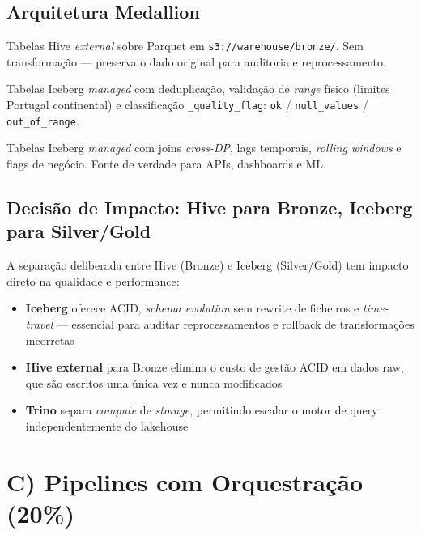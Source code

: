 \documentclass[11pt,a4paper]{article}
\begin{document}
\subsection{Arquitetura Medallion}

\begin{description}[leftmargin=*]
  \item[\textbf{Bronze}] Tabelas Hive \textit{external} sobre Parquet em \texttt{s3://warehouse/bronze/}. Sem transformação --- preserva o dado original para auditoria e reprocessamento.
  \item[\textbf{Silver}] Tabelas Iceberg \textit{managed} com deduplicação, validação de \textit{range} físico (limites Portugal continental) e classificação \texttt{\_quality\_flag}: \texttt{ok} / \texttt{null\_values} / \texttt{out\_of\_range}.
  \item[\textbf{Gold}] Tabelas Iceberg \textit{managed} com joins \textit{cross-DP}, lags temporais, \textit{rolling windows} e flags de negócio. Fonte de verdade para APIs, dashboards e ML.
\end{description}

\subsection{Decisão de Impacto: Hive para Bronze, Iceberg para Silver/Gold}

A separação deliberada entre Hive (Bronze) e Iceberg (Silver/Gold) tem impacto direto na qualidade e performance:

\begin{itemize}[leftmargin=*,noitemsep]
  \item \textbf{Iceberg} oferece ACID, \textit{schema evolution} sem rewrite de ficheiros e \textit{time-travel} --- essencial para auditar reprocessamentos e rollback de transformações incorretas
  \item \textbf{Hive external} para Bronze elimina o custo de gestão ACID em dados raw, que são escritos uma única vez e nunca modificados
  \item \textbf{Trino} separa \textit{compute} de \textit{storage}, permitindo escalar o motor de query independentemente do lakehouse
\end{itemize}

\section{C) Pipelines com Orquestração (20\%)}
\end{document}

